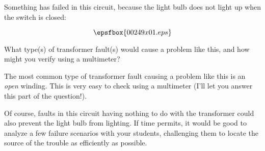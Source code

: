 

Something has failed in this circuit, because the light bulb does not light up when the switch is closed:

$$\epsfbox{00249x01.eps}$$

What type(s) of transformer fault(s) would cause a problem like this, and how might you verify using a multimeter?







The most common type of transformer fault causing a problem like this is an {\it open} winding.  This is very easy to check using a multimeter (I'll let you answer this part of the question!).







Of course, faults in this circuit having nothing to do with the transformer could also prevent the light bulb from lighting.  If time permits, it would be good to analyze a few failure scenarios with your students, challenging them to locate the source of the trouble as efficiently as possible.




